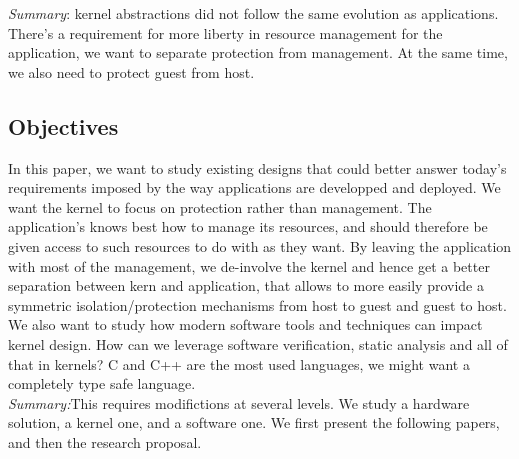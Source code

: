 \textit{Summary}: kernel abstractions did not follow the same evolution as applications.
There's a requirement for more liberty in resource management for the application, we want to separate protection from management.
At the same time, we also need to protect guest from host.

\subsection{Objectives}
 In this paper, we want to study existing designs that could better answer today's requirements imposed by the way applications are developped and deployed.
 We want the kernel to focus on protection rather than management.
 The application's knows best how to manage its resources, and should therefore be given access to such resources to do with as they want.
 By leaving the application with most of the management, we de-involve the kernel and hence get a better separation between kern and application, that allows to more easily provide a symmetric isolation/protection mechanisms from host to guest and guest to host.
 We also want to study how modern software tools and techniques can impact kernel design.
 How can we leverage software verification, static analysis and all of that in kernels? 
 C and C++ are the most used languages, we might want a completely type safe language.\\

 \textit{Summary:}This requires modifictions at several levels.
 We study a hardware solution, a kernel one, and a software one.
 We first present the following papers, and then the research proposal.


